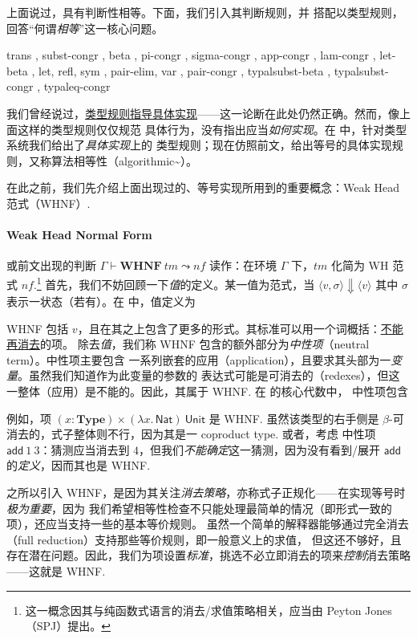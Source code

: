 上面说过，\Tigrisd 具有判断性相等。下面，我们引入其判断规则，并
搭配以类型规则，回答“何谓\emph{相等}”这一核心问题。

{
  trans
  , subst-congr
  , beta
  , pi-congr
  , sigma-congr
  , app-congr
  , lam-congr
  , let-beta
  , let, refl, sym
  , pair-elim, var
  , pair-congr
  , typalsubst-beta
  , typalsubst-congr
  , typaleq-congr
}

我们曾经说过，\underline{类型规则指导具体实现}——这一论断在此处仍然正确。然而，像上面这样的类型规则仅仅规范
具体行为，没有指出应当\emph{如何实现}。在 \Tigris 中，针对类型系统我们给出了\emph{具体实现}上的
类型规则；现在仿照前文，给出等号的具体实现规则，又称算法相等性（algorithmic\textasciitilde）。

在此之前，我们先介绍上面出现过的、等号实现所用到的重要概念：Weak Head 范式（WHNF）.

\paragraph{Weak Head Normal Form} 或前文出现的判断 $\Gamma\vdash\mathbf{WHNF}\ tm\leadsto nf$
读作：在环境 $\Gamma$ 下，$tm$ 化简为 WH 范式 $nf$.\footnote{
  这一概念因其与纯函数式语言的消去/求值策略相关，应当由 Peyton Jones（SPJ）提出。
}
首先，我们不妨回顾一下\emph{值}的定义。某一值为范式，当 $\langle v, \sigma\rangle\Downarrow\langle v\rangle$ 其中
$\sigma$ 表示一状态（若有）。在 \Tigrisd 中，值定义为


WHNF 包括 $v$，且在其之上包含了更多的形式。其标准可以用一个词概括：\underline{不能再消去}的项。
除去\emph{值}，我们称 WHNF 包含的额外部分为\emph{中性项}（neutral term）。中性项主要包含
一系列嵌套的应用（application），且要求其头部为一\emph{变量}。虽然我们知道作为此变量的参数的
表达式可能是可消去的（redexes），但这一整体（应用）是不能的。因此，其属于 WHNF. 在 \Tigrisd 的核心代数中，
中性项包含


例如，项 $(x : \mathbf{Type})\times (\lambda x.\,\mathsf{Nat})\ \mathsf{Unit}$ 是 WHNF.
虽然该类型的右手侧是 $\beta$-可消去的，式子整体则不行，因为其是一 coproduct type. 或者，考虑
中性项 $\mathsf{add}\ 1\ 3$：猜测应当消去到 $4$，但我们\emph{不能确定}这一猜测，因为没有看到/展开
$\mathsf{add}$ 的\emph{定义}，因而其也是 WHNF.

之所以引入 WHNF，是因为其关注\emph{消去策略}，亦称式子正规化——在实现等号时\emph{极为重要}，因为
我们希望相等性检查不只能处理最简单的情况（即形式一致的项），还应当支持一些\lambdacalc 的基本等价规则。
虽然一个简单的解释器能够通过完全消去（full reduction）支持那些等价规则，即一般意义上的求值，
但这还不够好，且存在潜在问题。因此，我们为项设置\emph{标准}，挑选不必立即消去的项来\emph{控制}消去策略——这就是 WHNF.

